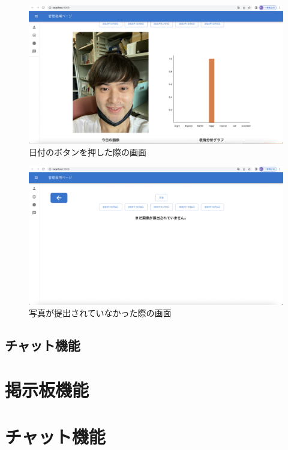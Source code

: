 \clearpage

\begin{figure}[!h]
	\begin{center}
			\includegraphics[scale=0.3, clip]{./img/sample10.png}
			\caption{日付のボタンを押した際の画面}
			\label{fig:図の名前}
	\end{center}
\end{figure}

\begin{figure}[!h]
	\begin{center}
			\includegraphics[scale=0.3, clip]{./img/sample11.png}
			\caption{写真が提出されていなかった際の画面}
			\label{fig:図の名前}
	\end{center}
\end{figure}

\subsection{チャット機能}

\section{掲示板機能}

\section{チャット機能}